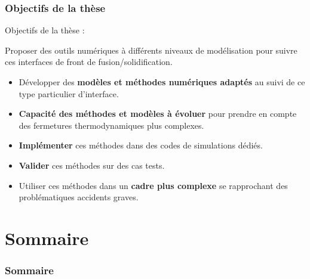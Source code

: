 \documentclass{beamer}
\begin{document}
\begin{frame}
    \frametitle{Objectifs de la thèse}
    \normalsize
    

        	\begin{ceaalertblock}{Objectifs de la thèse :}
        	
        	Proposer des outils numériques à différents niveaux de modélisation pour suivre ces interfaces de front de fusion/solidification.
        	\begin{itemize}
        		\item Développer des \textbf{modèles et méthodes numériques adaptés} au suivi de ce type particulier d'interface. 
        		\item \textbf{Capacité des méthodes et modèles à évoluer} pour prendre en compte des fermetures thermodynamiques plus complexes.
        		\item \textbf{Implémenter} ces méthodes dans des codes de simulations dédiés.
        		\item \textbf{Valider} ces méthodes sur des cas tests.
        		\item Utiliser ces méthodes dans un \textbf{cadre plus complexe} se rapprochant des problématiques accidents graves. 
        	\end{itemize}
        	\end{ceaalertblock}
\end{frame}
\section*{Sommaire}
\begin{frame}
\frametitle{Sommaire}
\footnotesize
  \tableofcontents
\end{frame}
\end{document}
